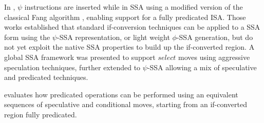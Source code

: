 In \cite{Stoutchinin_Gao_2004}, $\psi$ instructions are inserted while in SSA using a modified version of the classical Fang algorithm \cite{Fang:1996:CAI:645674.663446}, enabling support for a fully predicated ISA.
Those works established that standard if-conversion techniques can be applied to a SSA form using the $\psi$-SSA representation, or light weight $\phi$-SSA generation, but do not yet exploit the native SSA properties to build up the if-converted region.
A global SSA framework was presented \cite{odes_bruel} to support $select$ moves using aggressive speculation techniques, further extended to $\psi$-SSA \cite{ijes_bruel} allowing a mix of speculative and predicated techniques.

\cite{Mahlke95acomparison} evaluates how predicated operations can be performed using an equivalent sequences of speculative and conditional moves, starting from an if-converted region fully predicated. 











